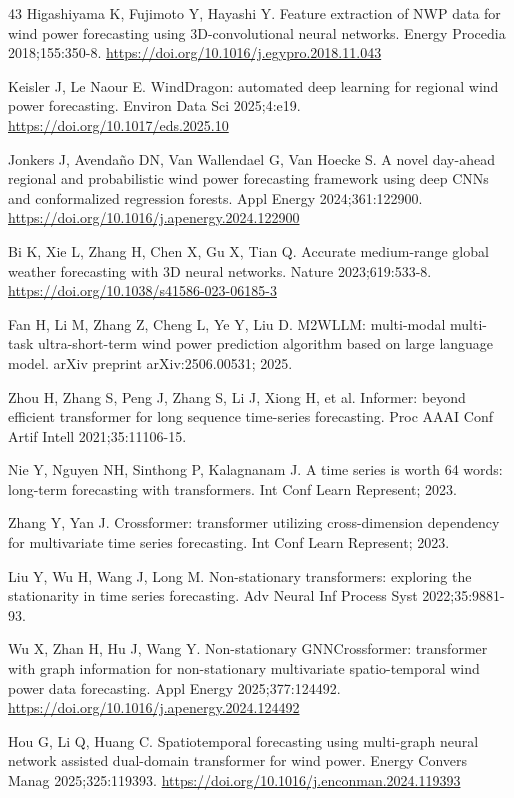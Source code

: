 \begin{thebibliography}{43}
Higashiyama K, Fujimoto Y, Hayashi Y. Feature extraction of NWP data for wind power forecasting using 3D-convolutional neural networks. Energy Procedia 2018;155:350-8. \url{https://doi.org/10.1016/j.egypro.2018.11.043}

Keisler J, Le Naour E. WindDragon: automated deep learning for regional wind power forecasting. Environ Data Sci 2025;4:e19. \url{https://doi.org/10.1017/eds.2025.10}

Jonkers J, Avendaño DN, Van Wallendael G, Van Hoecke S. A novel day-ahead regional and probabilistic wind power forecasting framework using deep CNNs and conformalized regression forests. Appl Energy 2024;361:122900. \url{https://doi.org/10.1016/j.apenergy.2024.122900}

Bi K, Xie L, Zhang H, Chen X, Gu X, Tian Q. Accurate medium-range global weather forecasting with 3D neural networks. Nature 2023;619:533-8. \url{https://doi.org/10.1038/s41586-023-06185-3}

Fan H, Li M, Zhang Z, Cheng L, Ye Y, Liu D. M2WLLM: multi-modal multi-task ultra-short-term wind power prediction algorithm based on large language model. arXiv preprint arXiv:2506.00531; 2025.

Zhou H, Zhang S, Peng J, Zhang S, Li J, Xiong H, et al. Informer: beyond efficient transformer for long sequence time-series forecasting. Proc AAAI Conf Artif Intell 2021;35:11106-15.

Nie Y, Nguyen NH, Sinthong P, Kalagnanam J. A time series is worth 64 words: long-term forecasting with transformers. Int Conf Learn Represent; 2023.

Zhang Y, Yan J. Crossformer: transformer utilizing cross-dimension dependency for multivariate time series forecasting. Int Conf Learn Represent; 2023.

Liu Y, Wu H, Wang J, Long M. Non-stationary transformers: exploring the stationarity in time series forecasting. Adv Neural Inf Process Syst 2022;35:9881-93.

Wu X, Zhan H, Hu J, Wang Y. Non-stationary GNNCrossformer: transformer with graph information for non-stationary multivariate spatio-temporal wind power data forecasting. Appl Energy 2025;377:124492. \url{https://doi.org/10.1016/j.apenergy.2024.124492}

Hou G, Li Q, Huang C. Spatiotemporal forecasting using multi-graph neural network assisted dual-domain transformer for wind power. Energy Convers Manag 2025;325:119393. \url{https://doi.org/10.1016/j.enconman.2024.119393}


\end{thebibliography}
